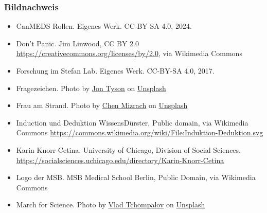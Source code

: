 \documentclass{beamer}
\begin{document}
\begin{frame}
\frametitle{Bildnachweis}

\vfill

\begin{tiny}
\begin{itemize}
\item 
CanMEDS Rollen. Eigenes Werk. CC-BY-SA 4.0, 2024. 

\item 
Don't Panic. Jim Linwood, CC BY 2.0 \url{https://creativecommons.org/licenses/by/2.0}, via Wikimedia Commons

\item 
Forschung im Stefan Lab. Eigenes Werk. CC-BY-SA 4.0, 2017.

\item 
Fragezeichen. Photo by \href{https://unsplash.com/@jontyson?utm_content=creditCopyText&utm_medium=referral&utm_source=unsplash}{Jon Tyson} on \href{https://unsplash.com/photos/white-markee-light-hhq1Lxtuwd8?utm_content=creditCopyText&utm_medium=referral&utm_source=unsplash}{Unsplash}
  

\item 
Frau am Strand. Photo by \href{https://unsplash.com/@chenhanozel?utm_content=creditCopyText&utm_medium=referral&utm_source=unsplash}{Chen Mizrach} on \href{https://unsplash.com/photos/woman-sits-on-brown-wooden-beach-chair-jL6PTWI7h18?utm_content=creditCopyText&utm_medium=referral&utm_source=unsplash}{Unsplash}

\item 
Induction und Deduktion WissensDürster, Public domain, via Wikimedia Commons \url{https://commons.wikimedia.org/wiki/File:Induktion-Deduktion.svg}

\item 
Karin Knorr-Cetina. University of Chicago, Division of Social Sciences. \url{https://socialsciences.uchicago.edu/directory/Karin-Knorr-Cetina}

\item
Logo der MSB. MSB Medical School Berlin, Public Domain, via Wikimedia Commons

\item 
March for Science. Photo by \href{https://unsplash.com/@tchompalov?utm_content=creditCopyText&utm_medium=referral&utm_source=unsplash}{Vlad Tchompalov} on \href{https://unsplash.com/photos/group-of-people-with-signages-nKNrOZ5MXZY?utm_content=creditCopyText&utm_medium=referral&utm_source=unsplash}{Unsplash}
  

\end{itemize}
\end{tiny}
\end{frame}
\end{document}
